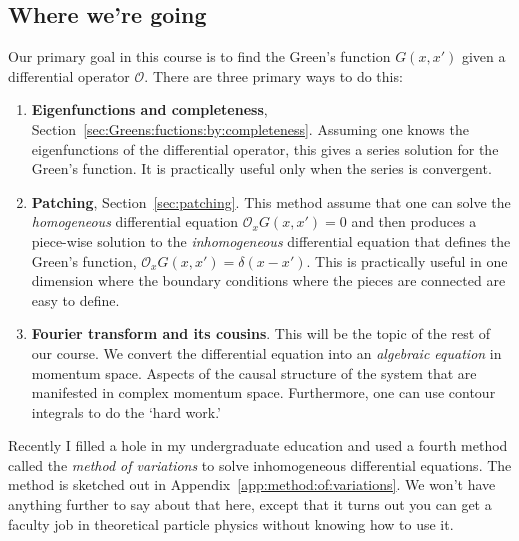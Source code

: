 \subsection{Where we're going}
\label{sec:ways:to:solve:G}

Our primary goal in this course is to find the Green's function $G(x,x')$ given a differential operator $\mathcal O$. There are three primary ways to do this:
\begin{enumerate}
\item \textbf{Eigenfunctions and completeness}, Section~\ref{sec:Greens:fuctions:by:completeness}. Assuming one knows the eigenfunctions of the differential operator, this gives a series solution for the Green's function. It is practically useful only when the series is convergent.

\item \textbf{Patching}, Section~\ref{sec:patching}. This method assume that one can solve the \emph{homogeneous} differential equation $\mathcal O_x G(x,x')=0$ and then produces a piece-wise solution to the \emph{inhomogeneous} differential equation that defines the Green's function, $\mathcal O_x G(x,x')=\delta(x-x')$. This is practically useful in one dimension where the boundary conditions where the pieces are connected are easy to define.

\item \textbf{Fourier transform and its cousins}. This will be the topic of the rest of our course. We convert the differential equation into an \emph{algebraic equation} in momentum space. Aspects of the causal structure of the system that are manifested in complex momentum space. Furthermore, one can use contour integrals to do the `hard work.'
\end{enumerate}

Recently I filled a hole in my undergraduate education and used a fourth method called the \emph{method of variations} to solve inhomogeneous differential equations. The method is sketched out in Appendix~\ref{app:method:of:variations}. We won't have anything further to say about that here, except that it turns out you can get a faculty job in theoretical particle physics without knowing how to use it.

